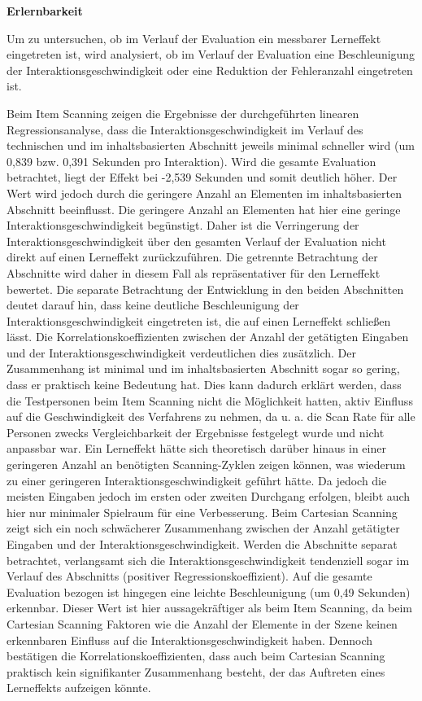 \textbf{Erlernbarkeit}

Um zu untersuchen, ob im Verlauf der Evaluation ein messbarer Lerneffekt eingetreten ist, wird analysiert, ob im Verlauf der Evaluation eine Beschleunigung der Interaktionsgeschwindigkeit oder eine Reduktion der Fehleranzahl eingetreten ist.

Beim Item Scanning zeigen die Ergebnisse der durchgeführten linearen Regressionsanalyse, dass die Interaktionsgeschwindigkeit im Verlauf des technischen und im inhaltsbasierten Abschnitt jeweils minimal schneller wird (um 0,839 bzw. 0,391 Sekunden pro Interaktion). Wird die gesamte Evaluation betrachtet, liegt der Effekt bei -2,539 Sekunden und somit deutlich höher. Der Wert wird jedoch durch die geringere Anzahl an Elementen im inhaltsbasierten Abschnitt beeinflusst. Die geringere Anzahl an Elementen hat hier eine geringe Interaktionsgeschwindigkeit begünstigt. Daher ist die Verringerung der Interaktionsgeschwindigkeit über den gesamten Verlauf der Evaluation nicht direkt auf einen Lerneffekt zurückzuführen. Die getrennte Betrachtung der Abschnitte wird daher in diesem Fall als repräsentativer für den Lerneffekt bewertet. Die separate Betrachtung der Entwicklung in den beiden Abschnitten deutet darauf hin, dass keine deutliche Beschleunigung der Interaktionsgeschwindigkeit eingetreten ist, die auf einen Lerneffekt schließen lässt. Die Korrelationskoeffizienten zwischen der Anzahl der getätigten Eingaben und der Interaktionsgeschwindigkeit verdeutlichen dies zusätzlich. Der Zusammenhang ist minimal und im inhaltsbasierten Abschnitt sogar so gering, dass er praktisch keine Bedeutung hat. Dies kann dadurch erklärt werden, dass die Testpersonen beim Item Scanning nicht die Möglichkeit hatten, aktiv Einfluss auf die Geschwindigkeit des Verfahrens zu nehmen, da u. a. die Scan Rate für alle Personen zwecks Vergleichbarkeit der Ergebnisse festgelegt wurde und nicht anpassbar war. Ein Lerneffekt hätte sich theoretisch darüber hinaus in einer geringeren Anzahl an benötigten Scanning-Zyklen zeigen können, was wiederum zu einer geringeren Interaktionsgeschwindigkeit geführt hätte. Da jedoch die meisten Eingaben jedoch im ersten oder zweiten Durchgang erfolgen, bleibt auch hier nur minimaler Spielraum für eine Verbesserung.
Beim Cartesian Scanning zeigt sich ein noch schwächerer Zusammenhang zwischen der Anzahl getätigter Eingaben und der Interaktionsgeschwindigkeit. Werden die Abschnitte separat betrachtet, verlangsamt sich die Interaktionsgeschwindigkeit tendenziell sogar im Verlauf des Abschnitts (positiver Regressionskoeffizient). Auf die gesamte Evaluation bezogen ist hingegen eine leichte Beschleunigung (um 0,49 Sekunden) erkennbar. Dieser Wert ist hier aussagekräftiger als beim Item Scanning, da beim Cartesian Scanning Faktoren wie die Anzahl der Elemente in der Szene keinen erkennbaren Einfluss auf die Interaktionsgeschwindigkeit haben. Dennoch bestätigen die Korrelationskoeffizienten, dass auch beim Cartesian Scanning praktisch kein signifikanter Zusammenhang besteht, der das Auftreten eines Lerneffekts aufzeigen könnte.

